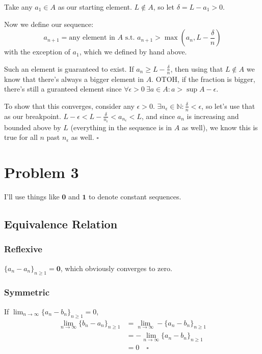 \documentclass[12pt]{article}
\newcommand{\N}{\mathbb{N}}
\begin{document}
Take any $a_1 \in A$ as our starting element.
$L \notin A$, so let $\delta = L-a_1 > 0$.

Now we define our sequence:
\[a_{n+1} = \text{any element in $A$ s.t. } a_{n+1} > \max\left(a_n, L - \frac{\delta}{n}\right)\]
with the exception of $a_1$, which we defined by hand above.

Such an element is guaranteed to exist.
If $a_n \ge L-\frac{\delta}{n}$, then using that $L \notin A$
we know that there's always a bigger element in $A$.
OTOH, if the fraction is bigger, there's still a guranteed element
since $\forall \epsilon > 0\ \exists a \in A: a > \sup A - \epsilon$.

To show that this converges, consider any $\epsilon > 0$.
$\exists n_\epsilon \in \N: \frac{\delta}{n} < \epsilon$,
so let's use that as our breakpoint.
$L - \epsilon < L-\frac{\delta}{n_\epsilon} < a_{n_\epsilon} < L$,
and since $a_n$ is increasing and bounded above by $L$ (everything in the sequence is in $A$ as well),
we know this is true for all $n$ past $n_\epsilon$ as well. $\square$

\pagebreak

\section{Problem 3}


I'll use things like $\mathbf{0}$ and $\mathbf{1}$ to denote constant sequences.

\subsection{Equivalence Relation}

\subsubsection{Reflexive}

$\{a_n-a_n\}_{n \ge 1}=\mathbf{0}$, which obviously converges to zero.

\subsubsection{Symmetric}

If $\lim_{n \to \infty} \{a_n-b_n\}_{n \ge 1} = 0$,
\begin{align*}
  \lim_{n \to \infty} \{b_n-a_n\}_{n \ge 1}
   & = \lim_{n \to \infty} -\{a_n-b_n\}_{n \ge 1} \\
   & = -\lim_{n \to \infty} \{a_n-b_n\}_{n \ge 1} \\
   & = 0 \quad\square
\end{align*}
\end{document}
